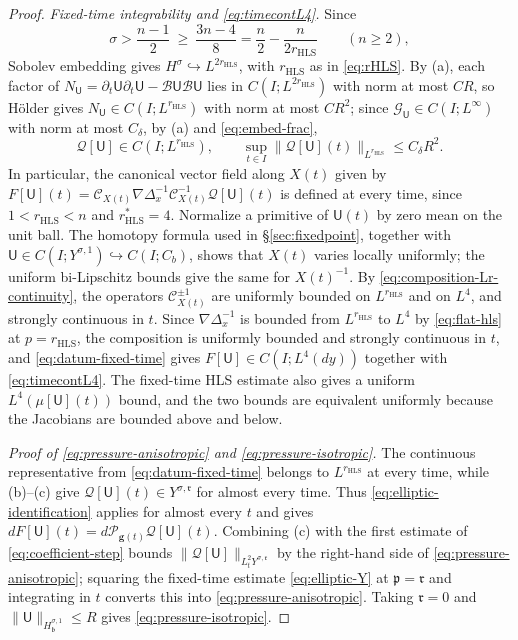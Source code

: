 \documentclass[11pt,reqno]{amsart}
\theoremstyle{plain}
\theoremstyle{definition}
\theoremstyle{remark}
\numberwithin{equation}{section}
\newcommand{\breg}{\mathfrak b}
\newcommand{\preg}{\mathfrak p}
\newcommand{\rpar}{\mathfrak r}
\newcommand{\Ufield}{\mathsf U}
\newcommand{\Ccoef}{\mathcal G}   %
\newcommand{\gmetric}{\mathbf g}
\begin{document}
\begin{proof}
\emph{Fixed-time integrability and \eqref{eq:timecontL4}.}  Since
\[
 \sigma>\frac{n-1}2\ \ge\ \frac{3n-4}{8}=\frac n2-\frac n{2r_{\mathrm{HLS}}}
 \qquad(n\ge2),
\]
Sobolev embedding gives $H^\sigma\hookrightarrow L^{2r_{\mathrm{HLS}}}$, with
$r_{\mathrm{HLS}}$ as in \eqref{eq:rHLS}.  By (a), each factor of
$N_{\Ufield}=\partial_t\Ufield \partial_t\Ufield
-\mathcal B\Ufield \mathcal B\Ufield$ lies in
$C(I;L^{2r_{\mathrm{HLS}}})$ with norm at most $CR$, so H\"older gives
$N_{\Ufield}\in C(I;L^{r_{\mathrm{HLS}}})$ with norm at most $CR^2$; since
$\Ccoef_{\Ufield}\in C(I;L^\infty)$ with norm at most $C_\delta$, by (a) and
\eqref{eq:embed-frac},
\begin{equation}\label{eq:datum-fixed-time}
 \mathcal Q[\Ufield]\in C(I;L^{r_{\mathrm{HLS}}}),
 \qquad
 \sup_{t\in I}\|\mathcal Q[\Ufield](t)\|_{L^{r_{\mathrm{HLS}}}}
 \le C_\delta R^2 .
\end{equation}
In particular, the canonical vector field along $X(t)$ given by
$F[\Ufield](t)=\mathcal C_{X(t)}\nabla\Delta_x^{-1}
\mathcal C_{X(t)}^{-1}\mathcal Q[\Ufield](t)$ is defined at every time, since
$1<r_{\mathrm{HLS}}<n$ and $r_{\mathrm{HLS}}^*=4$. Normalize a primitive of
$\Ufield(t)$ by zero mean on the unit ball. The homotopy formula used in
\S \ref{sec:fixedpoint}, together with
$\Ufield\in C(I;Y^{\sigma,1})\hookrightarrow C(I;C_b)$, shows that $X(t)$
varies locally uniformly; the uniform bi-Lipschitz bounds give the same for
$X(t)^{-1}$. By \eqref{eq:composition-Lr-continuity}, the operators
$\mathcal C_{X(t)}^{\pm1}$ are uniformly bounded on $L^{r_{\mathrm{HLS}}}$ and
on $L^4$, and strongly continuous in $t$.  Since $\nabla\Delta_x^{-1}$ is
bounded from $L^{r_{\mathrm{HLS}}}$ to $L^4$ by \eqref{eq:flat-hls} at
$p=r_{\mathrm{HLS}}$, the composition is uniformly bounded and strongly
continuous in $t$, and \eqref{eq:datum-fixed-time} gives
$F[\Ufield]\in C(I;L^4(dy))$ together with \eqref{eq:timecontL4}. The
fixed-time HLS estimate also gives a uniform $L^4(\mu[\Ufield](t))$ bound, and
the two bounds are equivalent uniformly because the Jacobians are bounded
above and below.

\emph{Proof of \eqref{eq:pressure-anisotropic} and \eqref{eq:pressure-isotropic}.}
The continuous representative from \eqref{eq:datum-fixed-time} belongs to
$L^{r_{\mathrm{HLS}}}$ at every time, while (b)--(c) give
$\mathcal Q[\Ufield](t)\in Y^{\sigma,\rpar}$ for almost every time. Thus
\eqref{eq:elliptic-identification} applies for almost every $t$ and gives
$dF[\Ufield](t)=d\mathcal P_{\gmetric(t)}\mathcal Q[\Ufield](t)$. Combining
(c) with the first estimate of \eqref{eq:coefficient-step} bounds
$\|\mathcal Q[\Ufield]\|_{L^2_tY^{\sigma,\rpar}}$ by the right-hand side of
\eqref{eq:pressure-anisotropic}; squaring the fixed-time estimate
\eqref{eq:elliptic-Y} at $\preg=\rpar$ and integrating in $t$ converts this
into \eqref{eq:pressure-anisotropic}.  Taking $\rpar=0$ and
$\|\Ufield\|_{H^{\sigma,1}_{\breg}}\le R$ gives \eqref{eq:pressure-isotropic}.


\end{proof}
\end{document}
